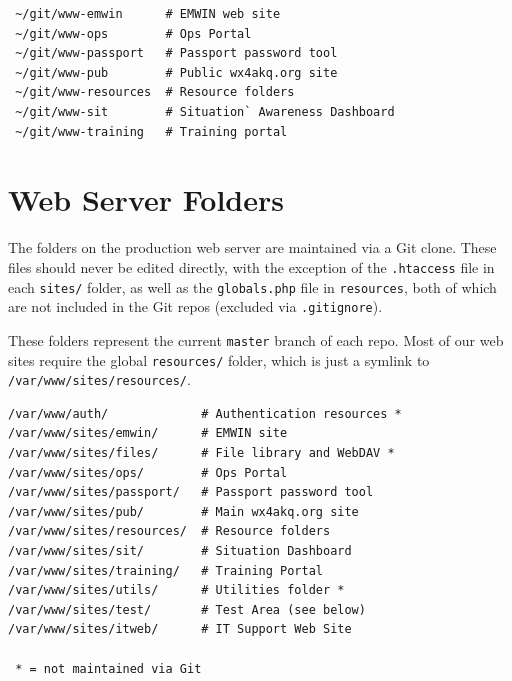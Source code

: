 \documentclass[pdflatex,letterpaper,twoside,12pt]{book}
\begin{document}
\begin{verbatim}
 ~/git/www-emwin      # EMWIN web site
 ~/git/www-ops        # Ops Portal  
 ~/git/www-passport   # Passport password tool
 ~/git/www-pub        # Public wx4akq.org site
 ~/git/www-resources  # Resource folders
 ~/git/www-sit        # Situation` Awareness Dashboard
 ~/git/www-training   # Training portal
\end{verbatim}



\section{Web Server Folders}

The folders on the production web server are maintained via a Git clone.  These files should never be edited directly, with the exception of the \texttt{.htaccess} file in each \texttt{sites/} folder, as well as the \texttt{globals.php} file in \texttt{resources}, both of which are not included in the Git repos (excluded via \texttt{.gitignore}).

These folders represent the current \texttt{master} branch of each repo.  Most of our web sites require the global \texttt{resources/} folder, which is just a symlink to\\\texttt{/var/www/sites/resources/}.

\begin{verbatim}
/var/www/auth/             # Authentication resources *
/var/www/sites/emwin/      # EMWIN site
/var/www/sites/files/      # File library and WebDAV *
/var/www/sites/ops/        # Ops Portal
/var/www/sites/passport/   # Passport password tool
/var/www/sites/pub/        # Main wx4akq.org site
/var/www/sites/resources/  # Resource folders
/var/www/sites/sit/        # Situation Dashboard
/var/www/sites/training/   # Training Portal
/var/www/sites/utils/      # Utilities folder *
/var/www/sites/test/       # Test Area (see below)
/var/www/sites/itweb/      # IT Support Web Site

 * = not maintained via Git
\end{verbatim}

\end{document}
